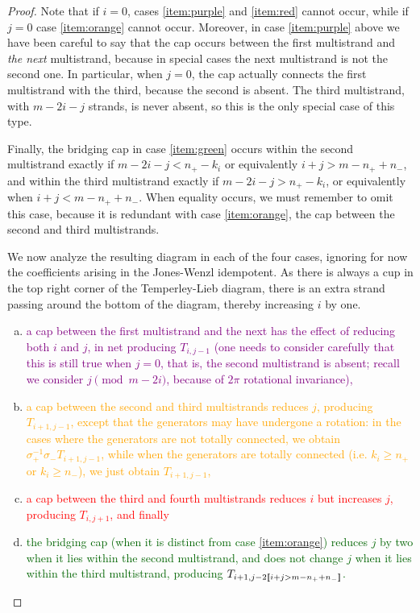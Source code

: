 \documentclass[12pt]{article}
\begin{document}
\begin{proof}
Note that if $i=0$, cases \eqref{item:purple} and \eqref{item:red} cannot occur, while if $j=0$ case \eqref{item:orange} cannot occur. Moreover, in case \eqref{item:purple} above we have been careful to say that the cap occurs between the first multistrand and \emph{the next} multistrand, because in special cases the next multistrand is not the second one. In particular, when $j=0$, the cap actually connects the first multistrand with the third, because the second is absent. The third multistrand, with $m-2i-j$ strands, is never absent, so this is the only special case of this type.

Finally, the bridging cap in case \eqref{item:green} occurs within the second multistrand exactly if $m-2i-j < n_+ - k_i$ or equivalently $i+j > m - n_+ + n_-$, and within the third multistrand exactly if $m-2i-j > n_+ - k_i$, or equivalently when $i+j < m - n_+ + n_-$. When equality occurs, we must remember to omit this case, because it is redundant with case \eqref{item:orange}, the cap between the second and third multistrands.

We now analyze the resulting diagram in each of the four cases, ignoring for now the coefficients arising in the Jones-Wenzl idempotent. As there is always a cup in the top right corner of the Temperley-Lieb diagram, there is an extra strand passing around the bottom of the diagram, thereby increasing $i$ by one.
\begin{enumerate}[(a)]
\item
\textcolor{purple}{
a cap between the first multistrand and the next has the effect of reducing both $i$ and $j$, in net producing $T_{i,j-1}$ (one needs to consider carefully that this is still true when $j=0$, that is, the second multistrand is absent; recall we consider $j \pmod{m-2i}$, because of $2\pi$ rotational invariance),
}
\item
\textcolor{orange}{
a cap between the second and third multistrands reduces $j$, producing $T_{i+1, j-1}$, except that the generators may have undergone a rotation: in the cases where the generators are not totally connected, we obtain $\sigma_+^{-1} \sigma_- T_{i+1, j-1}$, while when the generators are totally connected (i.e. $k_i \geq n_+$ or $k_i \geq   n_-$), we just obtain $T_{i+1,j-1}$,
}
\item
\textcolor{red}{
a cap between the third and fourth multistrands reduces $i$ but increases $j$, producing $T_{i, j+1}$, and finally
}
\item
\textcolor{DarkGreen}{
the bridging cap (when it is distinct from case \eqref{item:orange}) reduces $j$ by two when it lies within the second multistrand, and does not change $j$ when it lies within the third multistrand, producing $T_{i+1, j - 2[\![ i+j > m - n_+ + n_- ]\!]}$. 
}
\end{enumerate}


\end{proof}
\end{document}
